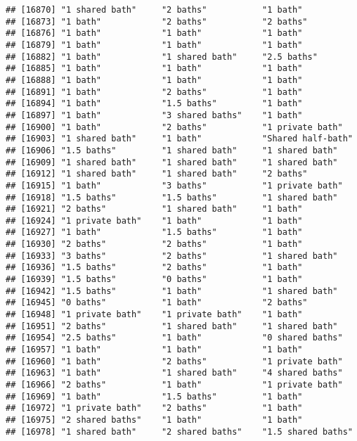 \documentclass[
]{article}
\begin{document}
\begin{verbatim}
## [16870] "1 shared bath"     "2 baths"           "1 bath"           
## [16873] "1 bath"            "2 baths"           "2 baths"          
## [16876] "1 bath"            "1 bath"            "1 bath"           
## [16879] "1 bath"            "1 bath"            "1 bath"           
## [16882] "1 bath"            "1 shared bath"     "2.5 baths"        
## [16885] "1 bath"            "1 bath"            "1 bath"           
## [16888] "1 bath"            "1 bath"            "1 bath"           
## [16891] "1 bath"            "2 baths"           "1 bath"           
## [16894] "1 bath"            "1.5 baths"         "1 bath"           
## [16897] "1 bath"            "3 shared baths"    "1 bath"           
## [16900] "1 bath"            "2 baths"           "1 private bath"   
## [16903] "1 shared bath"     "1 bath"            "Shared half-bath" 
## [16906] "1.5 baths"         "1 shared bath"     "1 shared bath"    
## [16909] "1 shared bath"     "1 shared bath"     "1 shared bath"    
## [16912] "1 shared bath"     "1 shared bath"     "2 baths"          
## [16915] "1 bath"            "3 baths"           "1 private bath"   
## [16918] "1.5 baths"         "1.5 baths"         "1 shared bath"    
## [16921] "2 baths"           "1 shared bath"     "1 bath"           
## [16924] "1 private bath"    "1 bath"            "1 bath"           
## [16927] "1 bath"            "1.5 baths"         "1 bath"           
## [16930] "2 baths"           "2 baths"           "1 bath"           
## [16933] "3 baths"           "2 baths"           "1 shared bath"    
## [16936] "1.5 baths"         "2 baths"           "1 bath"           
## [16939] "1.5 baths"         "0 baths"           "1 bath"           
## [16942] "1.5 baths"         "1 bath"            "1 shared bath"    
## [16945] "0 baths"           "1 bath"            "2 baths"          
## [16948] "1 private bath"    "1 private bath"    "1 bath"           
## [16951] "2 baths"           "1 shared bath"     "1 shared bath"    
## [16954] "2.5 baths"         "1 bath"            "0 shared baths"   
## [16957] "1 bath"            "1 bath"            "1 bath"           
## [16960] "1 bath"            "2 baths"           "1 private bath"   
## [16963] "1 bath"            "1 shared bath"     "4 shared baths"   
## [16966] "2 baths"           "1 bath"            "1 private bath"   
## [16969] "1 bath"            "1.5 baths"         "1 bath"           
## [16972] "1 private bath"    "2 baths"           "1 bath"           
## [16975] "2 shared baths"    "1 bath"            "1 bath"           
## [16978] "1 shared bath"     "2 shared baths"    "1.5 shared baths" 

\end{verbatim}
\end{document}

